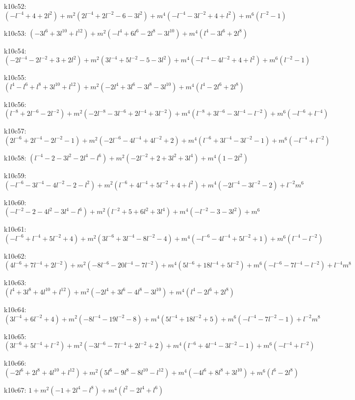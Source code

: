 k10c52: $ (-l^{-4}+4+2l^{2})  +m^{2}(2l^{-4}+2l^{-2}-6-3l^{2})  +m^{4}(-l^{-4}-3l^{-2}+4+l^{2})  +m^{6}(l^{-2}-1) $ 

k10c53: $ (-3l^{6}+3l^{10}+l^{12})  +m^{2}(-l^{4}+6l^{6}-2l^{8}-3l^{10})  +m^{4}(l^{4}-3l^{6}+2l^{8}) $ 

k10c54: $ (-2l^{-4}-2l^{-2}+3+2l^{2})  +m^{2}(3l^{-4}+5l^{-2}-5-3l^{2})  +m^{4}(-l^{-4}-4l^{-2}+4+l^{2})  +m^{6}(l^{-2}-1) $ 

k10c55: $ (l^{4}-l^{6}+l^{8}+3l^{10}+l^{12})  +m^{2}(-2l^{4}+3l^{6}-3l^{8}-3l^{10})  +m^{4}(l^{4}-2l^{6}+2l^{8}) $ 

k10c56: $ (l^{-8}+2l^{-6}-2l^{-2})  +m^{2}(-2l^{-8}-3l^{-6}+2l^{-4}+3l^{-2})  +m^{4}(l^{-8}+3l^{-6}-3l^{-4}-l^{-2})  +m^{6}(-l^{-6}+l^{-4}) $ 

k10c57: $ (2l^{-6}+2l^{-4}-2l^{-2}-1)  +m^{2}(-2l^{-6}-4l^{-4}+4l^{-2}+2)  +m^{4}(l^{-6}+3l^{-4}-3l^{-2}-1)  +m^{6}(-l^{-4}+l^{-2}) $ 

k10c58: $ (l^{-4}-2-3l^{2}-2l^{4}-l^{6})  +m^{2}(-2l^{-2}+2+3l^{2}+3l^{4})  +m^{4}(1-2l^{2}) $ 

k10c59: $ (-l^{-6}-3l^{-4}-4l^{-2}-2-l^{2})  +m^{2}(l^{-6}+4l^{-4}+5l^{-2}+4+l^{2})  +m^{4}(-2l^{-4}-3l^{-2}-2)  +l^{-2}m^{6} $ 

k10c60: $ (-l^{-2}-2-4l^{2}-3l^{4}-l^{6})  +m^{2}(l^{-2}+5+6l^{2}+3l^{4})  +m^{4}(-l^{-2}-3-3l^{2})  +m^{6} $ 

k10c61: $ (-l^{-6}+l^{-4}+5l^{-2}+4)  +m^{2}(3l^{-6}+3l^{-4}-8l^{-2}-4)  +m^{4}(-l^{-6}-4l^{-4}+5l^{-2}+1)  +m^{6}(l^{-4}-l^{-2}) $ 

k10c62: $ (4l^{-6}+7l^{-4}+2l^{-2})  +m^{2}(-8l^{-6}-20l^{-4}-7l^{-2})  +m^{4}(5l^{-6}+18l^{-4}+5l^{-2})  +m^{6}(-l^{-6}-7l^{-4}-l^{-2})  +l^{-4}m^{8} $ 

k10c63: $ (l^{4}+3l^{8}+4l^{10}+l^{12})  +m^{2}(-2l^{4}+3l^{6}-4l^{8}-3l^{10})  +m^{4}(l^{4}-2l^{6}+2l^{8}) $ 

k10c64: $ (3l^{-4}+6l^{-2}+4)  +m^{2}(-8l^{-4}-19l^{-2}-8)  +m^{4}(5l^{-4}+18l^{-2}+5)  +m^{6}(-l^{-4}-7l^{-2}-1)  +l^{-2}m^{8} $ 

k10c65: $ (3l^{-6}+5l^{-4}+l^{-2})  +m^{2}(-3l^{-6}-7l^{-4}+2l^{-2}+2)  +m^{4}(l^{-6}+4l^{-4}-3l^{-2}-1)  +m^{6}(-l^{-4}+l^{-2}) $ 

k10c66: $ (-2l^{6}+2l^{8}+4l^{10}+l^{12})  +m^{2}(5l^{6}-9l^{8}-8l^{10}-l^{12})  +m^{4}(-4l^{6}+8l^{8}+3l^{10})  +m^{6}(l^{6}-2l^{8}) $ 

k10c67: $ 1  +m^{2}(-1+2l^{4}-l^{8})  +m^{4}(l^{2}-2l^{4}+l^{6}) $ 

